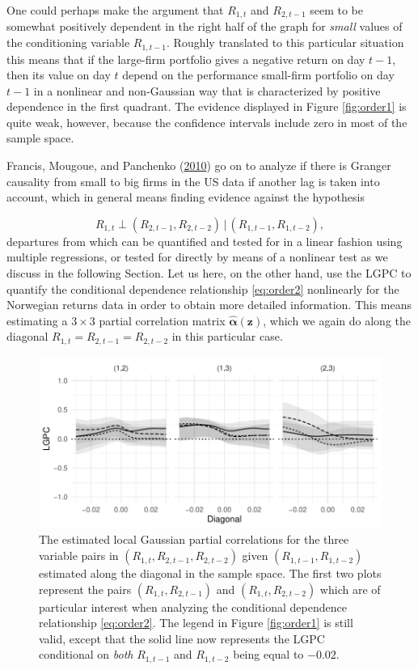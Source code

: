 \documentclass[
  12pt,
  letterpaper]{article}
\newcommand{\z}{\bm{z}}
\newcommand{\hfalpha}{\widehat{\bm{\alpha}}}
\theoremstyle{definition}
\theoremstyle{definition}
\theoremstyle{definition}
\theoremstyle{remark}
\begin{document}
One could perhaps make the argument that \(R_{1,t}\) and \(R_{2,t-1}\) seem to be somewhat positively dependent in the right half of the graph for \emph{small} values of the conditioning variable \(R_{1,t-1}\). Roughly translated to this particular situation this means that if the large-firm portfolio gives a negative return on day \(t-1\), then its value on day \(t\) depend on the performance small-firm portfolio on day \(t-1\) in a nonlinear and non-Gaussian way that is characterized by positive dependence in the first quadrant. The evidence displayed in Figure \ref{fig:order1} is quite weak, however, because the confidence intervals include zero in most of the sample space.

Francis, Mougoue, and Panchenko (\protect\hyperlink{ref-fran:moug:vale:2010}{2010}) go on to analyze if there is Granger causality from small to big firms in the US data if another lag is taken into account, which in general means finding evidence against the hypothesis

\begin{equation}
R_{1,t} \perp (R_{2,t-1}, R_{2, t-2}) \,|\, (R_{1, t-1}, R_{1, t-2}),
\label{eq:order2}
\end{equation}
departures from which can be quantified and tested for in a linear fashion using multiple regressions, or tested for directly by means of a nonlinear test as we discuss in the following Section. Let us here, on the other hand, use the LGPC to quantify the conditional dependence relationship \eqref{eq:order2} nonlinearly for the Norwegian returns data in order to obtain more detailed information. This means estimating a \(3\times3\) partial correlation matrix \(\hfalpha(\z)\), which we again do along the diagonal \(R_{1,t} = R_{2,t-1} = R_{2, t-2}\) in this particular case.

\begin{figure}[t]
\centering
\includegraphics{rcode_and_data/figures/granger-order2}
\caption{The estimated local Gaussian partial correlations for the three variable pairs in $(R_{1,t}, R_{2,t-1}, R_{2, t-2})$ given $(R_{1, t-1}, R_{1, t-2})$ estimated along the diagonal in the sample space. The first two plots represent the pairs $(R_{1,t}, R_{2,t-1})$ and $(R_{1,t}, R_{2,t-2})$ which are of particular interest when analyzing the conditional dependence relationship \eqref{eq:order2}. The legend in Figure \ref{fig:order1} is still valid, except that the solid line now represents the LGPC conditional on \emph{both} $R_{1, t-1}$ and $R_{1, t-2}$ being equal to $-0.02$.}
\label{fig:order2}
\end{figure}
\end{document}
